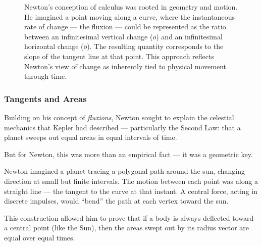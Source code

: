 \begin{figure}[H]
\centering
{}

\vspace{0.5em}
\caption{\small Newton's conception of calculus was rooted in geometry and motion. He imagined a point moving along a curve, where the instantaneous rate of change — the fluxion — could be represented as the ratio between an infinitesimal vertical change ($o$) and an infinitesimal horizontal change ($\bar{o}$). The resulting quantity corresponds to the slope of the tangent line at that point. This approach reflects Newton’s view of change as inherently tied to physical movement through time.}
\end{figure}



\subsubsection{Tangents and Areas} 

Building on his concept of \textit{fluxions}, Newton sought to explain the celestial mechanics that Kepler had described — particularly the Second Law: that a planet sweeps out equal areas in equal intervals of time.

But for Newton, this was more than an empirical fact — it was a geometric key.

Newton imagined a planet tracing a polygonal path around the sun, changing direction at small but finite intervals. The motion between each point was along a straight line — the tangent to the curve at that instant. A central force, acting in discrete impulses, would “bend” the path at each vertex toward the sun.

This construction allowed him to prove that if a body is always deflected toward a central point (like the Sun), then the areas swept out by its radius vector are equal over equal times.

